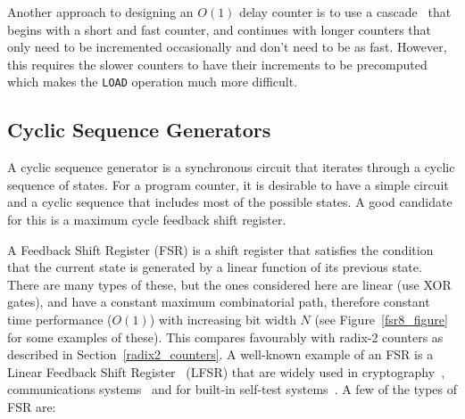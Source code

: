 \documentclass[5p, twocolumn]{elsarticle}
\begin{document}
Another approach to designing an $O(1)$ delay counter is to use a
cascade~\cite{parhami2000computer} that begins with a short and fast counter, and
continues with longer counters that only need to be incremented occasionally and
don't need to be as fast. However, this requires the slower counters to have
their increments to be precomputed~\cite{stan1998laf} which makes the \verb+LOAD+
operation much more difficult.


\subsection{Cyclic Sequence Generators}


A cyclic sequence generator is a synchronous circuit that iterates through a
cyclic sequence of states. For a program counter, it is desirable to have a
simple circuit and a cyclic sequence that includes most of the possible states. A
good candidate for this is a maximum cycle feedback shift register.

A Feedback Shift Register (FSR) is a shift register that satisfies the condition
that the current state is generated by a linear function of its previous state.
There are many types of these, but the ones considered here are linear (use XOR
gates), and have a constant maximum combinatorial path, therefore constant time
performance ($O(1)$) with increasing bit width $N$ (see Figure~\ref{fsr8_figure}
for some examples of these). This compares favourably with radix-2 counters as
described in Section~\ref{radix2_counters}. A well-known example of an FSR is a
Linear Feedback Shift Register~\cite{golomb1981srs,menezes1997ac} (LFSR) that are
widely used in cryptography~\cite{menezes1997ac}, communications
systems~\cite{pickholtz1982tss} and for built-in self-test
systems~\cite{agrawal1993tbs}. A few of the types of FSR are:

\end{document}
